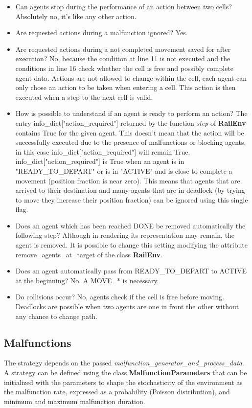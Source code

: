 \documentclass[11pt, a4paper, hidelinks]{report}
\begin{document}
\begin{itemize}
	\item Can agents stop during the performance of an action between two cells?
Absolutely no, it's like any other action.
	\item Are requested actions during a malfunction ignored?
Yes.
	\item Are requested actions during a not completed movement saved for after execution?
No, because the condition at line 11 is not executed and the conditions in line 16 check whether the cell is free and possibly complete agent data.
Actions are not allowed to change within the cell, each agent can only chose an action to be taken when entering a cell.
This action is then executed when a step to the next cell is valid.
	\item How is possible to understand if an agent is ready to perform an action?
The entry info\_dict["action\_required"] returned by the function \textit{step} of \textbf{RailEnv} contains True for the given agent.
This doesn't mean that the action will be successfully executed due to the presence of malfunctions or blocking agents, in this case info\_dict["action\_required"] will remain True.
info\_dict["action\_required"] is True when an agent is in "READY\_TO\_DEPART" or is in "ACTIVE" and is close to complete a movement (position fraction is near zero).
This means that agents that are arrived to their destination and many agents that are in deadlock (by trying to move they increase their position fraction) can be ignored using this single flag.
	\item Does an agent which has been reached DONE be removed automatically the following step?
Although in rendering its representation may remain, the agent is removed.
It is possible to change this setting modifying the attribute remove\_agents\_at\_target of the class \textbf{RailEnv}.
	\item Does an agent automatically pass from READY\_TO\_DEPART to ACTIVE at the beginning?
No. A MOVE\_* is necessary.
	\item Do collisions occur?
No, agents check if the cell is free before moving.
Deadlocks are possible when two agents are one in front the other without any chance to change path.
\end{itemize}

\subsection{Malfunctions}\label{subsec:malfunctions}
The strategy depends on the passed \textit{malfunction\_generator\_and\_process\_data}.
A strategy can be defined using the class \textbf{MalfunctionParameters} that can be initialized with the parameters to shape the stochasticity of the environment as the malfunction rate, expressed as a probability (Poisson distribution), and minimum and maximum malfunction duration.
\end{document}
